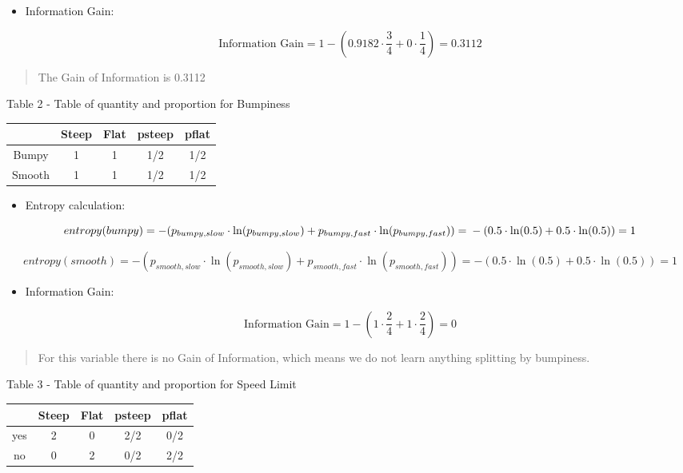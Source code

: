 \documentclass[]{book}
\providecommand{\tightlist}{%
  \setlength{\itemsep}{0pt}\setlength{\parskip}{0pt}}
\begin{document}
\begin{itemize}
\tightlist
\item
  Information Gain:
\end{itemize}

\[\text{Information Gain} = 1 - (0.9182 \cdot \frac{3}{4} + 0 \cdot \frac{1}{4}) = 0.3112 \]

\begin{quote}
The Gain of Information is 0.3112
\end{quote}

Table 2 - Table of quantity and proportion for Bumpiness

\begin{longtable}[]{@{}ccccc@{}}
\toprule
& Steep & Flat & psteep & pflat\tabularnewline
\midrule
\endhead
Bumpy & 1 & 1 & 1/2 & 1/2\tabularnewline
Smooth & 1 & 1 & 1/2 & 1/2\tabularnewline
\bottomrule
\end{longtable}

\begin{itemize}
\tightlist
\item
  Entropy calculation:
\end{itemize}

\[entropy(bumpy) = -(p_{bumpy,slow} \cdot \ln(p_{bumpy,slow}) + p_{bumpy,fast} \cdot \ln(p_{bumpy,fast})) = \\ -(0.5 \cdot \ln(0.5) + 0.5 \cdot \ln(0.5)) = 1 \]

\[entropy(smooth) = -(p_{smooth,slow} \cdot \ln(p_{smooth,slow}) + p_{smooth,fast} \cdot \ln(p_{smooth,fast})) = -(0.5 \cdot \ln(0.5) + 0.5 \cdot \ln(0.5)) = 1 \]

\begin{itemize}
\tightlist
\item
  Information Gain:
\end{itemize}

\[\text{Information Gain} = 1 - (1 \cdot \frac{2}{4} + 1 \cdot \frac{2}{4}) = 0\]

\begin{quote}
For this variable there is no Gain of Information, which means we do not
learn anything splitting by bumpiness.
\end{quote}

Table 3 - Table of quantity and proportion for Speed Limit

\begin{longtable}[]{@{}ccccc@{}}
\toprule
& Steep & Flat & psteep & pflat\tabularnewline
\midrule
\endhead
yes & 2 & 0 & 2/2 & 0/2\tabularnewline
no & 0 & 2 & 0/2 & 2/2\tabularnewline
\bottomrule
\end{longtable}
\end{document}
